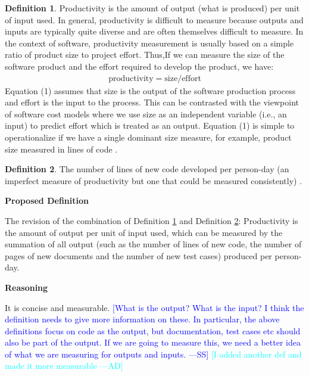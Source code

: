 \documentclass[letterpaper,cleveref]{lipics-v2019}
\newcommand{\authornote}[3]{\textcolor{#1}{[#3 ---#2]}}
\newcommand{\authornote}[3]{}
\newcommand{\wss}[1]{\authornote{blue}{SS}{#1}} %
\newcommand{\ad}[1]{\authornote{cyan}{AD}{#1}} %
\theoremstyle{definition}
\newtheorem{defn}{Definition}
\begin{document}
\begin{defn}
	\label{ProductivitySelected1}
Productivity is the amount of output (what is produced) per unit of input used.
In general, productivity is difficult to measure because outputs and inputs are
typically quite diverse and are often themselves difficult to measure. In the
context of software, productivity measurement is usually based on a simple ratio
of product size to project effort. Thus,If we can measure the size of the
software product and the effort required to develop the product, we have:
	\begin{align}
	\text{productivity} = \text{size}/\text{effort}
	\end{align}
Equation (1) assumes that size is the output of the software production process
and effort is the input to the process. This can be contrasted with the
	viewpoint of software cost models where we use size as an independent variable
	(i.e., an input) to predict effort which is treated as an output. Equation (1)
	is simple to operationalize if we have a single dominant size measure, for
	example, product size measured in lines of code \citep{Kitchenham2004}.
\end{defn}
\begin{defn}
	\label{ProductivitySelected2}
The number of lines of new code developed per person-day (an imperfect measure
of productivity but one that could be measured consistently)
\citep{MacCormack2003}.
\end{defn}

\noindent \textbf{Proposed Definition} 

The revision of the combination of Definition \ref{ProductivitySelected1} and
Definition \ref{ProductivitySelected2}: Productivity is the
amount of output per unit of input used, which can be measured by the summation
of all output (such as the number of lines of new code, the number of pages of
new documents and the number of new test cases) produced per person-day.

\noindent \textbf{Reasoning}

It is concise and measurable. \wss{What is the output?  What is the input?  I
	think the definition needs to give more information on these.  In particular,
	the above definitions focus on code as the output, but documentation, test
	cases etc should also be part of the output.  If we are going to measure this,
	we need a better idea of what we are measuring for outputs and inputs.}
	\ad{I added another def and made it more measurable}
\end{document}
